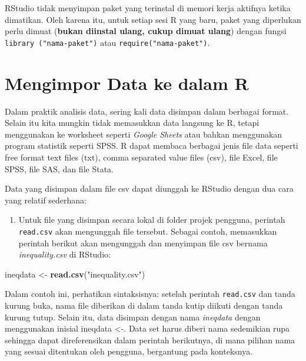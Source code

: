 \documentclass[a4paper, nobind]{templates/ociamthesis}
\providecommand{\tightlist}{%
  \setlength{\itemsep}{0pt}\setlength{\parskip}{0pt}}
\newenvironment{Shaded}{\begin{snugshade}}{\end{snugshade}}
\newcommand{\FunctionTok}[1]{\textcolor[rgb]{0.13,0.29,0.53}{\textbf{#1}}}
\newcommand{\NormalTok}[1]{#1}
\newcommand{\OtherTok}[1]{\textcolor[rgb]{0.56,0.35,0.01}{#1}}
\newcommand{\StringTok}[1]{\textcolor[rgb]{0.31,0.60,0.02}{#1}}
\renewenvironment{Shaded}
{
  \vspace{10pt}%
  \begin{snugshade}%
}{%
  \end{snugshade}%
  \vspace{8pt}%
}
\begin{document}
RStudio tidak menyimpan paket yang terinstal di memori kerja aktifnya ketika dimatikan. Oleh karena itu, untuk setiap sesi R yang baru, paket yang diperlukan perlu dimuat (\textbf{bukan diinstal ulang, cukup dimuat ulang}) dengan fungsi \texttt{library\ ("nama-paket")} atau \texttt{require("nama-paket")}.

\hypertarget{mengimpor-data-ke-dalam-r}{%
\section{Mengimpor Data ke dalam R}\label{mengimpor-data-ke-dalam-r}}

Dalam praktik analisis data, sering kali data disimpan dalam berbagai format. Selain itu kita mungkin tidak memasukkan data langsung ke R, tetapi menggunakan ke worksheet seperti \emph{Google Sheets} atau bahkan menggunakan program statistik seperti SPSS. R dapat membaca berbagai jenis file data seperti free format text files (txt), comma separated value ﬁles (csv), file Excel, file SPSS, file SAS, dan file Stata.

Data yang disimpan dalam file csv dapat diunggah ke RStudio dengan dua cara yang relatif sederhana:

\begin{enumerate}
\def\labelenumi{\arabic{enumi}.}
\tightlist
\item
  Untuk file yang disimpan secara lokal di folder projek pengguna, perintah \texttt{read.csv} akan mengunggah file tersebut. Sebagai contoh, memasukkan perintah berikut akan mengunggah dan menyimpan file csv bernama \emph{inequality.csv} di RStudio:
\end{enumerate}

\begin{Shaded}
\begin{Highlighting}[]
\NormalTok{ineqdata }\OtherTok{\textless{}{-}} \FunctionTok{read.csv}\NormalTok{(}\StringTok{"inequality.csv"}\NormalTok{)}
\end{Highlighting}
\end{Shaded}

Dalam contoh ini, perhatikan sintaksisnya: setelah perintah \texttt{read.csv} dan tanda kurung buka, nama file diberikan di dalam tanda kutip diikuti dengan tanda kurung tutup. Selain itu, data disimpan dengan nama \emph{ineqdata} dengan menggunakan inisial ineqdata \textless-. Data set harus diberi nama sedemikian rupa sehingga dapat direferensikan dalam perintah berikutnya, di mana pilihan nama yang sesuai ditentukan oleh pengguna, bergantung pada konteksnya.
\end{document}

